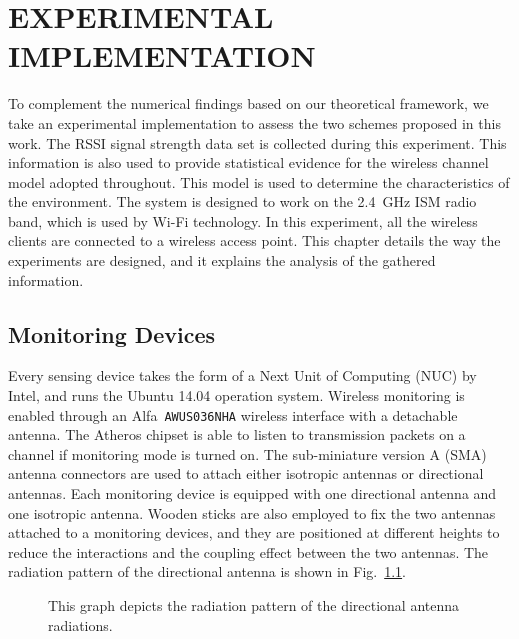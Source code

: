 \chapter{EXPERIMENTAL IMPLEMENTATION}
To complement the numerical findings based on our theoretical framework, we take an experimental implementation to assess the two schemes proposed in this work.
The RSSI signal strength data set is collected during this experiment. This information is also used to provide statistical evidence for the wireless channel model adopted
throughout. This model is used to determine the characteristics of the environment. The system is designed to work on the 2.4~GHz ISM radio band, which is used by Wi-Fi technology. In this experiment, all the wireless clients are connected to a wireless access point.
This chapter details the way the experiments are designed, and it explains the
analysis of the gathered information.


\section{Monitoring Devices}

Every sensing device takes the form of a Next Unit of Computing (NUC) by Intel{\texttrademark}, and runs the Ubuntu 14.04 operation system.
Wireless monitoring is enabled through an Alfa{\texttrademark}~\texttt{AWUS036NHA} wireless interface with a detachable antenna.
The Atheros{\texttrademark} chipset is able to listen to transmission packets on a channel if monitoring mode is turned on.
The sub-miniature version A (SMA) antenna connectors are used to attach either isotropic antennas or directional antennas.
Each monitoring device is equipped with one directional antenna and one isotropic antenna.
Wooden sticks are also employed to fix the two antennas attached to a monitoring devices, and they are positioned at different heights to reduce the interactions and the coupling effect between the two antennas.
The radiation pattern of the directional antenna is shown in Fig.~\ref{figure:Directionalantenna}.
\begin{figure}[t]
	\centerline{}
	\caption{This graph depicts the radiation pattern of the directional antenna radiations.}
	\label{figure:Directionalantenna}
\end{figure}

